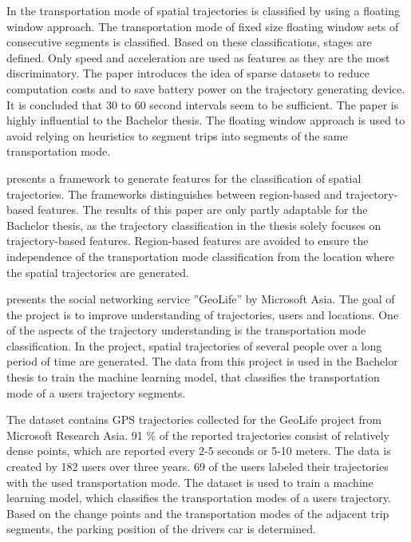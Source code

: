 In \cite{Bolbol2012} the transportation mode of spatial trajectories is classified by using a floating window approach. The transportation mode of fixed size floating window sets of consecutive segments is classified. Based on these classifications, stages are defined. Only speed and acceleration are used as features as they are the most discriminatory. The paper introduces the idea of sparse datasets to reduce computation costs and to save battery power on the trajectory generating device. It is concluded that 30 to 60 second intervals seem to be sufficient.\newline
The paper is highly influential to the Bachelor thesis. The floating window approach is used to avoid relying on heuristics to segment trips into segments of the same transportation mode.

\cite{lee2008traclass} presents a framework to generate features for the classification of spatial trajectories. The frameworks distinguishes between region-based and trajectory-based features.  \newline
The results of this paper are only partly adaptable for the Bachelor thesis, as the trajectory classification in the thesis solely focuses on trajectory-based features. Region-based features are avoided to ensure the independence of the transportation mode classification from the location where the spatial trajectories are generated.

\cite{zheng2010geolife} presents the social networking service ''GeoLife'' by Microsoft Asia. The goal of the project is to improve understanding of trajectories, users and locations. One of the aspects of the trajectory understanding is the transportation mode classification. In the project, spatial trajectories of several people over a long period of time are generated.\newline
The data from this project is used in the Bachelor thesis to train the machine learning model, that classifies the transportation mode of a users trajectory segments.

The dataset \cite{zheng2010geolife} \cite{zheng2008understanding} \cite{geolife-dataset} \cite{zheng2009mining} contains GPS trajectories collected for the GeoLife project from Microsoft Research Asia. 91 \% of the reported trajectories consist of relatively dense points, which are reported every 2-5 seconds or 5-10 meters. The data is created by 182 users over three years. 69 of the users labeled their trajectories with the used transportation mode. \newline
The dataset is used to train a machine learning model, which classifies the transportation modes of a users trajectory. Based on the change points and the transportation modes of the adjacent trip segments, the parking position of the drivers car is determined. 

